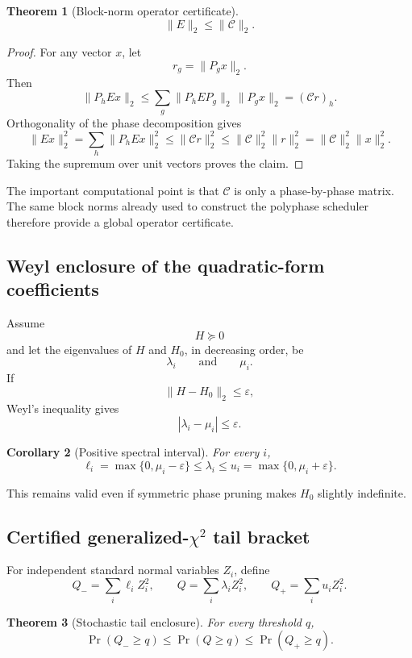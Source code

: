 \documentclass[11pt]{article}
\newtheorem{theorem}{Theorem}[section]
\newtheorem{corollary}[theorem]{Corollary}
\theoremstyle{definition}
\theoremstyle{remark}
\begin{document}
\begin{theorem}[Block-norm operator certificate]
\[
\boxed{
\|E\|_2
\le
\|\mathcal C\|_2.
}
\]
\end{theorem}

\begin{proof}
For any vector \(x\), let
\[
r_g=\|P_gx\|_2.
\]
Then
\[
\|P_hEx\|_2
\le
\sum_g
\|P_hEP_g\|_2\,\|P_gx\|_2
=
(\mathcal C r)_h.
\]
Orthogonality of the phase decomposition gives
\[
\|Ex\|_2^2
=
\sum_h\|P_hEx\|_2^2
\le
\|\mathcal C r\|_2^2
\le
\|\mathcal C\|_2^2\|r\|_2^2
=
\|\mathcal C\|_2^2\|x\|_2^2.
\]
Taking the supremum over unit vectors proves the claim.
\end{proof}

The important computational point is that \(\mathcal C\) is only a
phase-by-phase matrix.  The same block norms already used to construct the
polyphase scheduler therefore provide a global operator certificate.

\subsection{Weyl enclosure of the quadratic-form coefficients}

Assume
\[
H\succeq0
\]
and let the eigenvalues of \(H\) and \(H_0\), in decreasing order, be
\[
\lambda_i
\qquad\text{and}\qquad
\mu_i.
\]
If
\[
\|H-H_0\|_2\le\varepsilon,
\]
Weyl's inequality gives
\[
|\lambda_i-\mu_i|\le\varepsilon.
\]

\begin{corollary}[Positive spectral interval]
For every \(i\),
\[
\boxed{
\ell_i
=
\max\{0,\mu_i-\varepsilon\}
\le
\lambda_i
\le
u_i
=
\max\{0,\mu_i+\varepsilon\}.
}
\]
\end{corollary}

This remains valid even if symmetric phase pruning makes \(H_0\) slightly
indefinite.

\subsection{Certified generalized-\texorpdfstring{\(\chi^2\)}{chi-square} tail bracket}

For independent standard normal variables \(Z_i\), define
\[
Q_-=\sum_i\ell_iZ_i^2,
\qquad
Q=\sum_i\lambda_iZ_i^2,
\qquad
Q_+=\sum_i u_iZ_i^2.
\]

\begin{theorem}[Stochastic tail enclosure]
For every threshold \(q\),
\[
\boxed{
\Pr(Q_-\ge q)
\le
\Pr(Q\ge q)
\le
\Pr(Q_+\ge q).
}
\]
\end{theorem}
\end{document}
